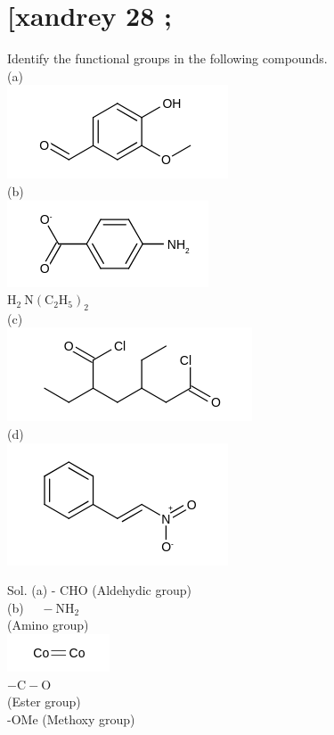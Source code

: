 \documentclass[10pt]{article}
\begin{document}
\section*{[xandrey 28 ;}
Identify the functional groups in the following compounds.\\
(a)\\
\includegraphics{smile-67f1fe610df7add83fb065fc2e8f56457000034b}\\
(b)\\
\includegraphics{smile-2d2ef93b50f5bbebb815f3322dd6323790197edb}\\
$\mathrm{H}_{2} \mathrm{~N}\left(\mathrm{C}_{2} \mathrm{H}_{5}\right)_{2}$\\
(c)\\
\includegraphics{smile-c60ea7572bbcf8c089dca3c66c9a0d3bb0305176}\\
(d)\\
\includegraphics{smile-652b77b22cada894eb3d530c0380215ad690d9db}

Sol. (a) - CHO (Aldehydic group)\\
(b) $\quad-\mathrm{NH}_{2}$\\
(Amino group)\\
\includegraphics{smile-7da9f2d291b1f05589906d84b4f4bb9a87478e1d}\\
$-\mathrm{C}-\mathrm{O}$\\
(Ester group)\\
-OMe (Methoxy group)
\end{document}
